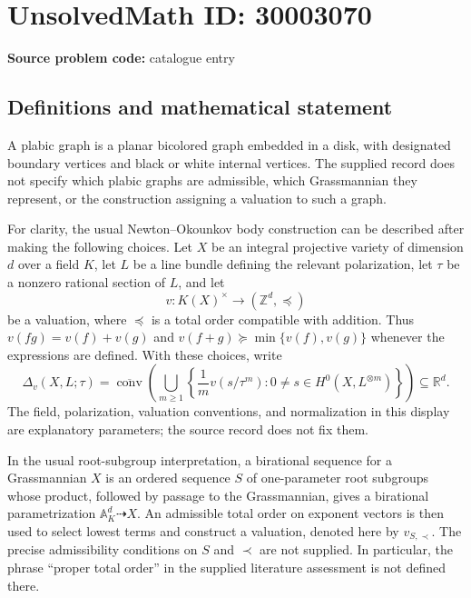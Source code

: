 \documentclass[11pt]{article}
\newcommand{\Z}{\mathbb{Z}}
\newcommand{\R}{\mathbb{R}}
\newcommand{\A}{\mathbb{A}}
\begin{document}
\section*{UnsolvedMath ID: 30003070}
\textbf{Source problem code:} catalogue entry
\subsection{Definitions and mathematical statement}
A plabic graph is a planar bicolored graph embedded in a disk, with designated boundary vertices and black or white internal vertices. The supplied record does not specify which plabic graphs are admissible, which Grassmannian they represent, or the construction assigning a valuation to such a graph.

For clarity, the usual Newton--Okounkov body construction can be described after making the following choices. Let \(X\) be an integral projective variety of dimension \(d\) over a field \(K\), let \(L\) be a line bundle defining the relevant polarization, let \(\tau\) be a nonzero rational section of \(L\), and let
\[
 v:K(X)^\times\longrightarrow (\Z^d,\preceq)
\]
be a valuation, where \(\preceq\) is a total order compatible with addition. Thus \(v(fg)=v(f)+v(g)\) and \(v(f+g)\succeq\min\{v(f),v(g)\}\) whenever the expressions are defined. With these choices, write
\[
 \Delta_v(X,L;\tau)
 =\overline{\operatorname{conv}}\!\left(
 \bigcup_{m\geq 1}
 \left\{\frac{1}{m}v(s/\tau^m):
 0\neq s\in H^0(X,L^{\otimes m})\right\}
 \right)\subseteq\R^d.
\]
The field, polarization, valuation conventions, and normalization in this display are explanatory parameters; the source record does not fix them.

In the usual root-subgroup interpretation, a birational sequence for a Grassmannian \(X\) is an ordered sequence \(S\) of one-parameter root subgroups whose product, followed by passage to the Grassmannian, gives a birational parametrization \(\A_K^d\dashrightarrow X\). An admissible total order on exponent vectors is then used to select lowest terms and construct a valuation, denoted here by \(v_{S,\prec}\). The precise admissibility conditions on \(S\) and \(\prec\) are not supplied. In particular, the phrase ``proper total order'' in the supplied literature assessment is not defined there.
\end{document}

